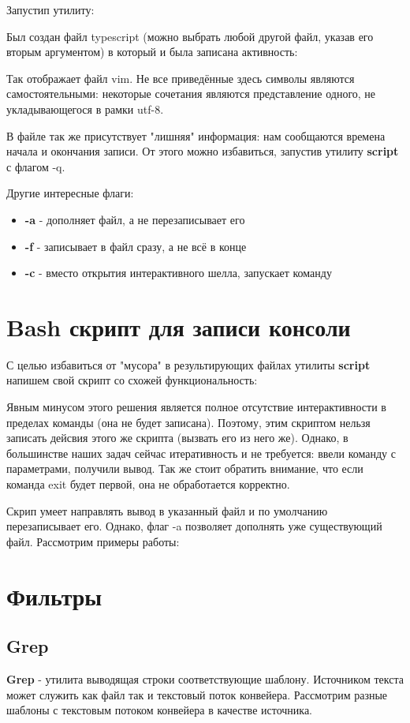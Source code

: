 \documentclass[a4paper]{article}
\begin{document}
Запустип утилиту:

Был создан файл typescript (можно выбрать любой другой файл, указав его вторым аргументом) в который и была записана активность:

Так отображает файл vim. Не все приведённые здесь символы являются самостоятельными: некоторые сочетания являются представление одного, не укладывающегося в рамки utf-8.

В файле так же присутствует "лишняя" информация: нам сообщаются времена начала и окончания записи. От этого можно избавиться, запустив утилиту \textbf{script} с флагом -q.

Другие интересные флаги:
\begin{itemize}
\item \textbf{-a} - дополняет файл, а не перезаписывает его
\item \textbf{-f} - записывает в файл сразу, а не всё в конце
\item \textbf{-c} - вместо открытия интерактивного шелла, запускает команду
\end{itemize}

\section{ Bash скрипт для записи консоли}
С целью избавиться от "мусора" в результирующих файлах утилиты \textbf{script} напишем свой скрипт со схожей функциональность:


Явным минусом этого решения является полное отсутствие интерактивности в пределах команды (она не будет записана). Поэтому, этим скриптом нельзя записать дейсвия этого же скрипта (вызвать его из него же). Однако, в большинстве наших задач сейчас итеративность и не требуется: ввели команду с параметрами, получили вывод. Так же стоит обратить внимание, что если команда exit будет первой, она не обработается корректно.

Скрип умеет направлять вывод в указанный файл и по умолчанию перезаписывает его. Однако, флаг -a позволяет дополнять уже существующий файл. Рассмотрим примеры работы:

\section{Фильтры}

\subsection{Grep}
\textbf{Grep} - утилита выводящая строки соответствующие шаблону. Источником текста может служить как файл так и текстовый поток конвейера. Рассмотрим разные шаблоны с текстовым потоком конвейера в качестве источника.
\end{document}
